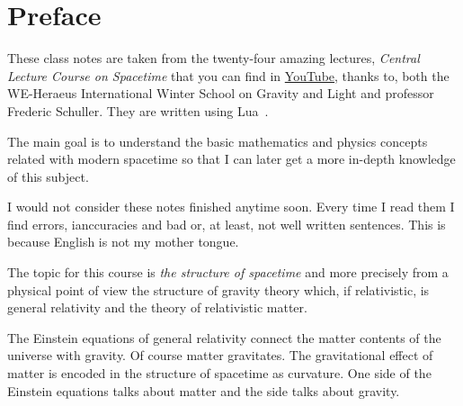 %

\chapter{Preface}
These class notes are taken from the twenty-four amazing lectures,
\emph{Central Lecture Course on Spacetime} that you can find in
\href{https://www.youtube.com/playlist?list=PLFeEvEPtX_0S6vxxiiNPrJbLu9aK1UVC_}{YouTube},
thanks to, both the WE-Heraeus International Winter School on Gravity and Light and professor
Frederic Schuller. They are written using Lua\LaTex\ .

The main goal is to understand the basic mathematics and physics concepts related with modern
spacetime so that I can later get a more in-depth knowledge of this subject.

I would not consider these notes finished anytime soon. Every time I read them I find errors,
ianccuracies and bad or, at least, not well written sentences. This is because English is not
my mother tongue.

The topic for this course is \emph{the structure of spacetime} and more precisely from a
physical point of view the structure of gravity theory which, if relativistic, is general
relativity and the theory of relativistic matter.

The Einstein equations of general relativity connect the matter contents of the universe with
gravity. Of course matter gravitates. The gravitational effect of matter is encoded in the
structure of spacetime as curvature. One side of the Einstein equations talks about matter and
the side talks about gravity.

